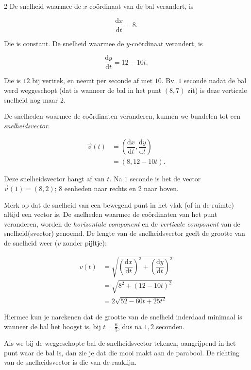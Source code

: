 \begin{multicols}{2}
De snelheid waarmee de $x$-coördinaat van de bal verandert, is

$$\frac{\mathrm{d}x}{\mathrm{d}t}=8.$$ 

Die is constant. De snelheid waarmee de $y$-coördinaat verandert, is

$$\frac{\mathrm{d}y}{\mathrm{d}t}=12-10t.$$ 

Die is $12$ bij vertrek, en neemt per seconde af met $10$. Bv. $1$ seconde nadat de bal werd weggeschopt (dat is wanneer de bal in het punt $(8, 7)$ zit) is deze verticale snelheid nog maar $2$.

De snelheden waarmee de coördinaten veranderen, kunnen we bundelen tot een \emph{snelheidsvector}.

 $$
\begin{array}{cl}
    
     \overrightarrow{v}(t)& =\left(\dfrac{\mathrm{d}x}{\mathrm{d}t}, \dfrac{\mathrm{d}y}{\mathrm{d}t}\right) \\
     & =(8, 12-10t).
    
\end{array}
 $$


Deze snelheidsvector hangt af van $t$. Na $1$ seconde is het de vector $\overrightarrow{v}(1)=(8, 2)$; $8$ eenheden naar rechts en $2$ naar boven.

Merk op dat de snelheid van een bewegend punt in het vlak (of in de ruimte) altijd een vector is. De snelheden waarmee de coördinaten van het punt veranderen, worden de \emph{horizontale component} en de  \emph{verticale component} van de snelheid(svector) genoemd. De lengte van de snelheidsvector geeft de grootte van de snelheid weer ($v$ zonder pijltje):

$$
\begin{array}{cl}
     v(t)& =\sqrt{\left(\dfrac{\mathrm{d}x}{\mathrm{d}t}\right)^2+\left(\dfrac{\mathrm{d}y}{\mathrm{d}t}\right)^2} \\
     & = \sqrt{8^2+(12-10t)^2}\\
     & =2\sqrt{52-60t+25t^2}
\end{array}
$$

Hiermee kun je narekenen dat de grootte van de snelheid inderdaad minimaal is wanneer de bal het hoogst is, bij $t=\frac{6}{5}$, dus na $1,2$ seconden.

Als we bij de weggeschopte bal de snelheidsvector tekenen, aangrijpend in het punt waar de bal is, dan zie je dat die mooi raakt aan de parabool. De richting van de snelheidsvector is die van de raaklijn. 


\end{multicols}
